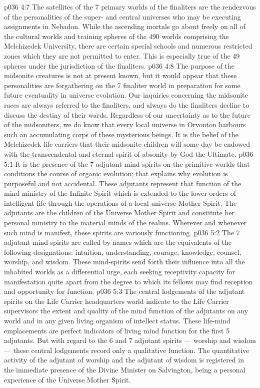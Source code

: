 \vs p036 4:7 The satellites of the 7 primary worlds of the finaliters are the rendezvous of the personalities of the super\hyp{} and central universes who may be executing assignments in Nebadon. While the ascending mortals go about freely on all of the cultural worlds and training spheres of the 490 worlds comprising the Melchizedek University, there are certain special schools and numerous restricted zones which they are not permitted to enter. This is especially true of the 49 spheres under the jurisdiction of the finaliters.
\vs p036 4:8 \pc The purpose of the midsonite creatures is not at present known, but it would appear that these personalities are forgathering on the 7 finaliter world in preparation for some future eventuality in universe evolution. Our inquiries concerning the midsonite races are always referred to the finaliters, and always do the finaliters decline to discuss the destiny of their wards. Regardless of our uncertainty as to the future of the midsoniters, we do know that every local universe in Orvonton harbours such an accumulating corps of these mysterious beings. It is the belief of the Melchizedek life carriers that their midsonite children will some day be endowed with the transcendental and eternal spirit of absonity by God the Ultimate.
\vs p036 5:1 It is the presence of the 7 adjutant mind\hyp{}spirits on the primitive worlds that conditions the course of organic evolution; that explains why evolution is purposeful and not accidental. These adjutants represent that function of the mind ministry of the Infinite Spirit which is extended to the lower orders of intelligent life through the operations of a local universe Mother Spirit. The adjutants are the children of the Universe Mother Spirit and constitute her personal ministry to the material minds of the realms. Wherever and whenever such mind is manifest, these spirits are variously functioning.
\vs p036 5:2 The 7 adjutant mind\hyp{}spirits are called by names which are the equivalents of the following designations: intuition, understanding, courage, knowledge, counsel, worship, and wisdom. These mind\hyp{}spirits send forth their influence into all the inhabited worlds as a differential urge, each seeking receptivity capacity for manifestation quite apart from the degree to which its fellows may find reception and opportunity for function.
\vs p036 5:3 The central lodgements of the adjutant spirits on the Life Carrier headquarters world indicate to the Life Carrier supervisors the extent and quality of the mind function of the adjutants on any world and in any given living organism of intellect status. These life\hyp{}mind emplacements are perfect indicators of living mind function for the first 5 adjutants. But with regard to the 6 and 7 adjutant spirits --- worship and wisdom --- these central lodgements record only a qualitative function. The quantitative activity of the adjutant of worship and the adjutant of wisdom is registered in the immediate presence of the Divine Minister on Salvington, being a personal experience of the Universe Mother Spirit.
